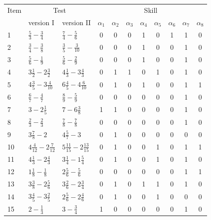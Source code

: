 \documentclass[english]{pwr_wmat_praca_dyplomowa}
\theoremstyle{plain}
\theoremstyle{definition}
\numberwithin{theorem}{chapter}
\begin{document}
\begin{table}[H]
	\centering
	\begin{tabular}{l l l c c c c c c c c} 
		\hline
		{\rule{0pt}{3ex}}Item & \multicolumn{2}{c}{Test} & \multicolumn{8}{c}{Skill} \\
		& version I & version II &  $\alpha_1$ & $\alpha_2$ & $\alpha_3$ &  $\alpha_4$ & $\alpha_5$ & $\alpha_6$ & $\alpha_7$ & $\alpha_8$ \\ [0.5ex] 
		\hline
		{\rule{0pt}{3ex}}1 & $\frac{5}{3} - \frac{3}{4}$ & $\frac{7}{4} - \frac{5}{6}$ & 0 & 0 & 0 & 1 & 0 & 1 & 1 & 0 \\ [1ex]
		2 & $\frac{3}{4} - \frac{3}{8}$ & $\frac{3}{5} - \frac{3}{10}$ & 0 & 0 & 0 & 1 & 0 & 0 & 1 & 0 \\ [1ex]
		3 & $\frac{5}{6} - \frac{1}{9}$ & $\frac{5}{6} - \frac{2}{9}$ & 0 & 0 & 0 & 1 & 0 & 0 & 1 & 0 \\ [1ex]
		4 & $3\frac{1}{2} - 2\frac{3}{2}$ & $4\frac{1}{3} - 3\frac{4}{3}$ & 0 & 1 & 1 & 0 & 1 & 0 & 1 & 0 \\ [1ex]
		5 & $4\frac{3}{5} - 3\frac{4}{10}$ & $6\frac{4}{5} - 4\frac{6}{10}$ & 0 & 1 & 0 & 1 & 0 & 0 & 1 & 1 \\ [1ex]
		6 & $\frac{6}{7} - \frac{4}{7}$ & $\frac{8}{9} - \frac{5}{9}$ & 0 & 0 & 0 & 0 & 0 & 0 & 1 & 0 \\ [1ex]
		7 & $3 - 2\frac{1}{5}$ & $7 - 6\frac{3}{8}$ & 1 & 1 & 0 & 0 & 0 & 0 & 1 & 0 \\ [1ex]
		8 & $\frac{2}{3} - \frac{2}{3}$ & $\frac{7}{8} - \frac{7}{8}$ & 0 & 0 & 0 & 0 & 0 & 0 & 1 & 0 \\ [1ex]
		9 & $3\frac{7}{8} - 2$ & $4\frac{5}{7} - 3$ & 0 & 1 & 0 & 0 & 0 & 0 & 0 & 0 \\ [1ex]
		10 & $4\frac{4}{12} - 2\frac{7}{12}$ & $5\frac{11}{15} - 2\frac{13}{15}$ & 0 & 1 & 0 & 0 & 1 & 0 & 1 & 1 \\ [1ex]
		11 & $4\frac{1}{3} - 2\frac{4}{3}$ & $3\frac{1}{4} - 1\frac{5}{4}$ & 0 & 1 & 0 & 0 & 1 & 0 & 1 & 0 \\ [1ex]
		12 & $1\frac{1}{8} - \frac{1}{8}$ & $2\frac{5}{6} - \frac{5}{6}$ & 0 & 0 & 0 & 0 & 0 & 0 & 1 & 1 \\ [1ex]
		13 & $3\frac{3}{8} - 2\frac{5}{6}$ & $3\frac{2}{6} - 2\frac{3}{4}$ & 0 & 1 & 0 & 1 & 1 & 0 & 1 & 0 \\ [1ex]
		14 & $3\frac{4}{5} - 3\frac{2}{5}$ & $2\frac{5}{6} - 2\frac{4}{6}$ & 0 & 1 & 0 & 0 & 1 & 0 & 0 & 0 \\ [1ex]
		15 & $2 - \frac{1}{3}$ & $3 - \frac{3}{4}$ & 1 & 0 & 0 & 0 & 0 & 0 & 1 & 0 \\ [1ex]

\end{tabular}
\end{table}
\end{document}

